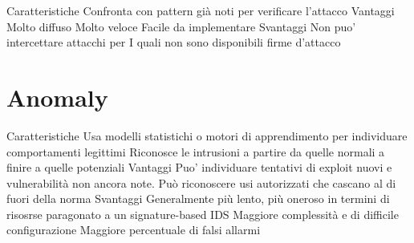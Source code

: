Caratteristiche
Confronta con pattern già noti
per verificare l’attacco
Vantaggi
Molto diffuso
Molto veloce
Facile da implementare
Svantaggi
Non puo’ intercettare attacchi per I quali non sono disponibili firme d’attacco

\section{Anomaly}

Caratteristiche
 Usa modelli statistichi o motori di apprendimento per individuare comportamenti legittimi
 Riconosce le intrusioni a partire da quelle normali a finire a quelle potenziali
  Vantaggi
 Puo’ individuare tentativi di exploit nuovi e vulnerabilità non ancora note.
 Può riconoscere usi autorizzati che cascano al di fuori della norma
  Svantaggi
 Generalmente più lento, più oneroso in termini di risosrse paragonato a un signature-based IDS
Maggiore complessità e di difficile configurazione
Maggiore percentuale di falsi allarmi

